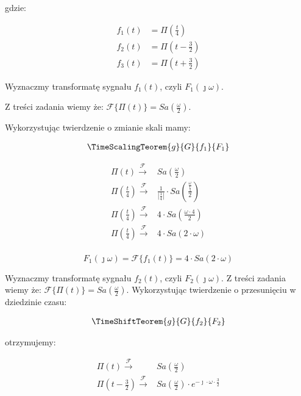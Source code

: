 \begin{task}
gdzie:

\begin{align*}
f_1(t) &= \Pi\left(\frac{t}{4}\right)\\
f_2(t) &= \Pi\left(t - \frac{3}{2}\right)\\
f_3(t) &= \Pi\left(t + \frac{3}{2}\right)
\end{align*}

Wyznaczmy transformatę sygnału $f_1(t)$, czyli $F_1\left(\jmath\omega\right)$. 

Z treści zadania wiemy że: $\mathcal F \{\Pi(t)\} = Sa\left(\frac{\omega}{2}\right)$.

Wykorzystując twierdzenie o zmianie skali mamy:

\begin{align*}
\TimeScalingTeorem{g}{G}{f_1}{F_1}
\end{align*}


\begin{align*}
\Pi(t) \xrightarrow{\mathcal F} & Sa\left(\frac{\omega}{2}\right)\\
\Pi(\frac{t}{4}) \xrightarrow{\mathcal F} & \frac{1}{\left|\frac{1}{4}\right|} \cdot Sa\left(\frac{ \frac{\omega}{ \frac{1}{4} }}{2}\right)\\
\Pi(\frac{t}{4}) \xrightarrow{\mathcal F} & 4 \cdot Sa\left(\frac{\omega \cdot 4}{2}\right)\\
\Pi(\frac{t}{4}) \xrightarrow{\mathcal F} & 4 \cdot Sa\left(2 \cdot \omega \right)\\
\end{align*}


\begin{equation}
F_{1}(\jmath \omega) = \mathcal F\{f_{1}(t)\} = 4 \cdot Sa\left(2 \cdot \omega\right)
\end{equation}

Wyznaczmy transformatę sygnału $f_2(t)$, czyli $F_2\left(\jmath\omega\right)$.
Z treści zadania wiemy że: $\mathcal F \{\Pi(t)\} = Sa\left(\frac{\omega}{2}\right)$.
Wykorzystując twierdzenie o przesunięciu w dziedzinie czasu:

\begin{align*}
\TimeShiftTeorem{g}{G}{f_2}{F_2}
\end{align*}

otrzymujemy:

\begin{align*}
\Pi(t) \xrightarrow{\mathcal F} & Sa\left(\frac{\omega}{2}\right)\\
\Pi\left(t-\frac{3}{2}\right) \xrightarrow{\mathcal F} & Sa\left(\frac{\omega}{2}\right) \cdot e^{-\jmath \cdot \omega \cdot \frac{3}{2}}
\end{align*}


\end{task}
